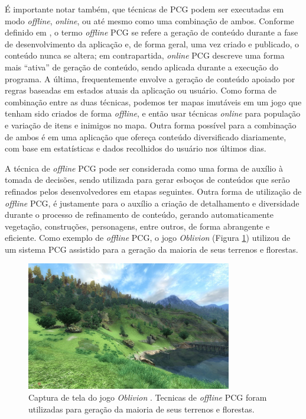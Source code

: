 É importante notar também, que técnicas de PCG podem ser executadas em modo \emph{offline}, \emph{online}, ou até mesmo como uma combinação de ambos. Conforme definido em \cite{togelius2011search}, o termo \emph{offline} PCG se refere a geração de conteúdo durante a fase de desenvolvimento da aplicação e, de forma geral, uma vez criado e publicado, o conteúdo nunca se altera; em contrapartida, \emph{online} PCG descreve uma forma mais “ativa” de geração de conteúdo, sendo aplicada durante a execução do programa. A última, frequentemente envolve a geração de conteúdo apoiado por regras baseadas em estados atuais da aplicação ou usuário. Como forma de combinação entre as duas técnicas, podemos ter mapas imutáveis em um jogo que tenham sido criados de forma \emph{offline}, e então usar técnicas \emph{online} para população e variação de itens e inimigos no mapa. Outra forma possível para a combinação de ambos é em uma aplicação que ofereça conteúdo diversificado diariamente, com base em estatísticas e dados recolhidos do usuário nos últimos dias.

A técnica de \emph{offline} PCG pode ser considerada como uma forma de auxílio à tomada de decisões, sendo utilizada para gerar esboços de conteúdos que serão refinados pelos desenvolvedores em etapas seguintes. Outra forma de utilização de \emph{offline} PCG, é justamente para o auxílio a criação de detalhamento e diversidade durante o processo de refinamento de conteúdo, gerando automaticamente vegetação, construções, personagens, entre outros, de forma abrangente e eficiente. Como exemplo de \emph{offline} PCG, o jogo \emph{Oblivion} \cite{game:oblivion} (Figura \ref{fig:game_oblivion}) utilizou de um sistema PCG assistido para a geração da maioria de seus terrenos e florestas.

\begin{figure}[htb]
	\begin{center}
		\includegraphics[width=0.8\textwidth]{Imagens/game_oblivion.jpg}
		\caption{Captura de tela do jogo \emph{Oblivion} \cite{game:oblivion}. Tecnicas de \emph{offline} PCG foram utilizadas para geração da maioria de seus terrenos e florestas.}
		\label{fig:game_oblivion}
	\end{center}
\end{figure}

